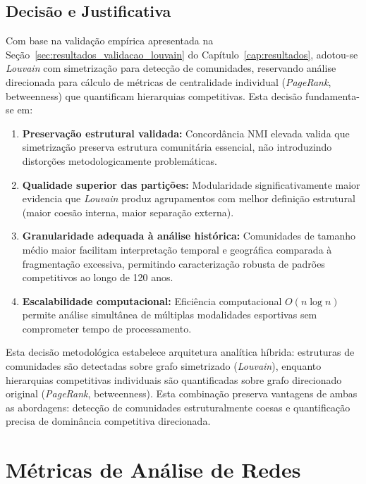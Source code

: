\subsection{Decisão e Justificativa}

Com base na validação empírica apresentada na Seção~\ref{sec:resultados_validacao_louvain} do Capítulo~\ref{cap:resultados}, adotou-se \textit{Louvain} com simetrização para detecção de comunidades, reservando análise direcionada para cálculo de métricas de centralidade individual (\textit{PageRank}, betweenness) que quantificam hierarquias competitivas. Esta decisão fundamenta-se em:

\begin{enumerate}
    \item \textbf{Preservação estrutural validada:} Concordância NMI elevada valida que simetrização preserva estrutura comunitária essencial, não introduzindo distorções metodologicamente problemáticas.

    \item \textbf{Qualidade superior das partições:} Modularidade significativamente maior evidencia que \textit{Louvain} produz agrupamentos com melhor definição estrutural (maior coesão interna, maior separação externa).

    \item \textbf{Granularidade adequada à análise histórica:} Comunidades de tamanho médio maior facilitam interpretação temporal e geográfica comparada à fragmentação excessiva, permitindo caracterização robusta de padrões competitivos ao longo de 120 anos.

    \item \textbf{Escalabilidade computacional:} Eficiência computacional $O(n \log n)$ permite análise simultânea de múltiplas modalidades esportivas sem comprometer tempo de processamento.
\end{enumerate}

Esta decisão metodológica estabelece arquitetura analítica híbrida: estruturas de comunidades são detectadas sobre grafo simetrizado (\textit{Louvain}), enquanto hierarquias competitivas individuais são quantificadas sobre grafo direcionado original (\textit{PageRank}, betweenness). Esta combinação preserva vantagens de ambas as abordagens: detecção de comunidades estruturalmente coesas e quantificação precisa de dominância competitiva direcionada.

\section{Métricas de Análise de Redes}

